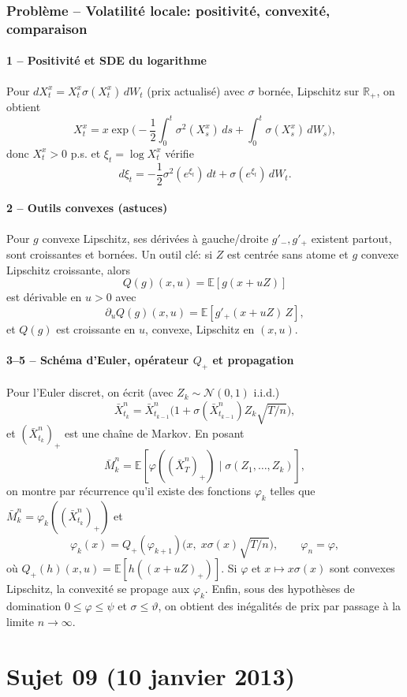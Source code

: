 \documentclass[11pt,a4paper]{article}
\newcommand{\E}{\mathbb{E}}
\newcommand{\R}{\mathbb{R}}
\newcommand{\1}{\mathbbm{1}}
\theoremstyle{plain}
\theoremstyle{definition}
\begin{document}
\section{Problème -- Volatilité locale: positivité, convexité, comparaison}
\subsection{1 -- Positivité et SDE du logarithme}
Pour $dX_t^x=X_t^x\sigma(X_t^x)\,dW_t$ (prix actualisé) avec $\sigma$ bornée, Lipschitz sur $\R_+$, on obtient
\[
X_t^x=x\exp\Big(-\frac12\int_0^t \sigma^2(X_s^x)\,ds+\int_0^t \sigma(X_s^x)\,dW_s\Big),
\]
donc $X_t^x>0$ p.s. et $\xi_t=\log X_t^x$ vérifie
\[
d\xi_t=-\frac12\sigma^2(e^{\xi_t})\,dt+\sigma(e^{\xi_t})\,dW_t.
\]

\subsection{2 -- Outils convexes (astuces)}
Pour $g$ convexe Lipschitz, ses dérivées à gauche/droite $g'_-,g'_+$ existent partout, sont croissantes et bornées.
Un outil clé: si $Z$ est centrée sans atome et $g$ convexe Lipschitz croissante, alors
\[
Q(g)(x,u)=\E[g(x+uZ)]
\]
est dérivable en $u>0$ avec
\[
\partial_u Q(g)(x,u)=\E[g'_+(x+uZ)\,Z],
\]
et $Q(g)$ est croissante en $u$, convexe, Lipschitz en $(x,u)$.

\subsection{3--5 -- Schéma d'Euler, opérateur $Q_+$ et propagation}
Pour l'Euler discret, on écrit (avec $Z_k\sim\mathcal N(0,1)$ i.i.d.)
\[
\bar X_{t_k}^n=\bar X_{t_{k-1}}^n\Big(1+\sigma(\bar X_{t_{k-1}}^n)Z_k\sqrt{T/n}\Big),
\]
et $(\bar X_{t_k}^n)_+$ est une chaîne de Markov.
En posant
\[
\bar M_k^n=\E[\varphi((\bar X_T^n)_+)\mid \sigma(Z_1,\dots,Z_k)],
\]
on montre par récurrence qu'il existe des fonctions $\varphi_k$ telles que $\bar M_k^n=\varphi_k((\bar X_{t_k}^n)_+)$ et
\[
\varphi_k(x)=Q_+(\varphi_{k+1})\Big(x,\;x\sigma(x)\sqrt{T/n}\Big),
\qquad \varphi_n=\varphi,
\]
où $Q_+(h)(x,u)=\E[h((x+uZ)_+)]$.
Si $\varphi$ et $x\mapsto x\sigma(x)$ sont convexes Lipschitz, la convexité se propage aux $\varphi_k$.
Enfin, sous des hypothèses de domination $0\le \varphi\le \psi$ et $\sigma\le \vartheta$, on obtient des inégalités de prix par passage à la limite $n\to\infty$.

\part{Sujet 09 (10 janvier 2013)}
\end{document}
